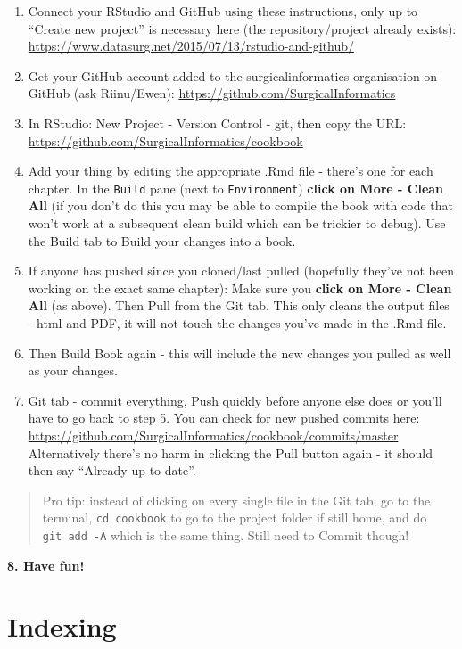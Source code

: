 \documentclass[
]{book}
\begin{document}
\begin{enumerate}
\def\labelenumi{\arabic{enumi}.}
\item
  Connect your RStudio and GitHub using these instructions, only up to ``Create new project'' is necessary here (the repository/project already exists):
  \url{https://www.datasurg.net/2015/07/13/rstudio-and-github/}
\item
  Get your GitHub account added to the surgicalinformatics organisation on GitHub (ask Riinu/Ewen):
  \url{https://github.com/SurgicalInformatics}
\item
  In RStudio: New Project - Version Control - git, then copy the URL: \url{https://github.com/SurgicalInformatics/cookbook}
\item
  Add your thing by editing the appropriate .Rmd file - there's one for each chapter. In the \texttt{Build} pane (next to \texttt{Environment}) \textbf{click on More - Clean All} (if you don't do this you may be able to compile the book with code that won't work at a subsequent clean build which can be trickier to debug). Use the Build tab to Build your changes into a book.
\item
  If anyone has pushed since you cloned/last pulled (hopefully they've not been working on the exact same chapter): Make sure you \textbf{click on More - Clean All} (as above). Then Pull from the Git tab. This only cleans the output files - html and PDF, it will not touch the changes you've made in the .Rmd file.
\item
  Then Build Book again - this will include the new changes you pulled as well as your changes.
\item
  Git tab - commit everything, Push quickly before anyone else does or you'll have to go back to step 5. You can check for new pushed commits here: \url{https://github.com/SurgicalInformatics/cookbook/commits/master} Alternatively there's no harm in clicking the Pull button again - it should then say ``Already up-to-date''.
\end{enumerate}

\begin{quote}
Pro tip: instead of clicking on every single file in the Git tab, go to the terminal, \texttt{cd\ cookbook} to go to the project folder if still home, and do \texttt{git\ add\ -A} which is the same thing. Still need to Commit though!
\end{quote}

\textbf{8. Have fun!}

\hypertarget{indexing}{%
\section{Indexing}\label{indexing}}
\end{document}
